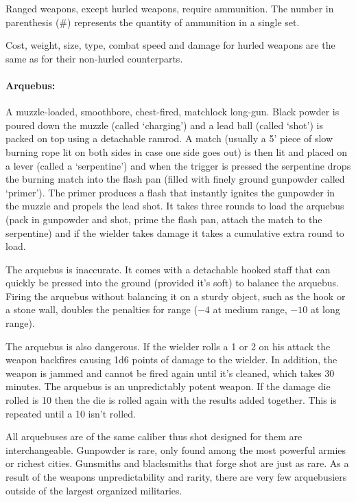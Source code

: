 \begin{multicols}{2}
Ranged weapons, except hurled weapons, require ammunition.  The number in parenthesis (\#) represents the quantity of ammunition in a single set.

Cost, weight, size, type, combat speed and damage for hurled weapons are the same as for their non-hurled counterparts.  

\paragraph{Arquebus:}  A muzzle-loaded, smoothbore, chest-fired, matchlock long-gun.  Black powder is poured down the muzzle (called `charging') and a lead ball (called `shot') is packed on top using a detachable ramrod.  A match (usually a 5' piece of slow burning rope lit on both sides in case one side goes out) is then lit and placed on a lever (called a `serpentine') and when the trigger is pressed the serpentine drops the burning match into the flash pan (filled with finely ground gunpowder called `primer').  The primer produces a flash that instantly ignites the gunpowder in the muzzle and propels the lead shot.  It takes three rounds to load the arquebus (pack in gunpowder and shot, prime the flash pan, attach the match to the serpentine) and if the wielder takes damage it takes a cumulative extra round to load.

The arquebus is inaccurate.  It comes with a detachable hooked staff that can quickly be pressed into the ground (provided it's soft) to balance the arquebus.  Firing the arquebus without balancing it on a sturdy object, such as the hook or a stone wall, doubles the penalties for range ($-4$ at medium range, $-10$ at long range).

The arquebus is also dangerous.  If the wielder rolls a 1 or 2 on his attack the weapon backfires causing 1d6 points of damage to the wielder.  In addition, the weapon is jammed and cannot be fired again until it's cleaned, which takes 30 minutes.  The arquebus is an unpredictably potent weapon.  If the damage die rolled is 10 then the die is rolled again with the results added together.  This is repeated until a 10 isn't rolled.

All arquebuses are of the same caliber thus shot designed for them are interchangeable.  Gunpowder is rare, only found among the most powerful armies or richest cities. Gunsmiths and blacksmiths that forge shot are just as rare.  As a result of the weapons unpredictability and rarity, there are very few arquebusiers outside of the largest organized militaries.


\end{multicols}
